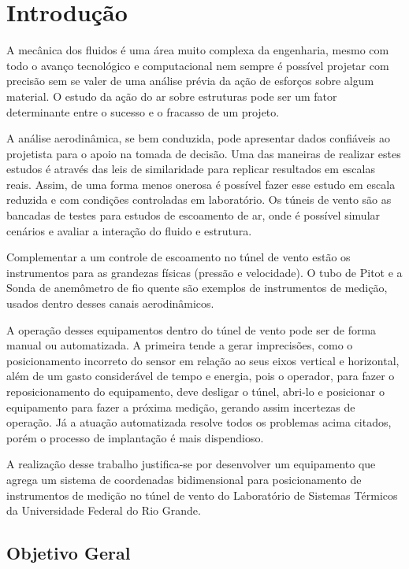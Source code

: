 \chapter{Introdução}\label{ch:introducao}
A mecânica dos fluidos é uma área muito complexa da engenharia, mesmo com todo o avanço tecnológico e computacional 
nem sempre é possível projetar com precisão sem se valer de uma análise prévia da ação de esforços sobre algum material.
O estudo da ação do ar sobre estruturas pode ser um fator determinante entre o sucesso e o fracasso de um projeto.

A análise aerodinâmica, se bem conduzida, pode apresentar dados confiáveis ao projetista para o apoio na tomada 
de decisão. Uma das maneiras de realizar estes estudos é através das leis de similaridade para replicar resultados em escalas reais. 
Assim, de uma forma menos onerosa é possível fazer esse estudo em escala reduzida e com condições controladas 
em laboratório. Os túneis de vento são as bancadas de testes para estudos de escoamento de ar, onde é possível simular cenários e avaliar a interação do fluido e estrutura.

Complementar a um controle de escoamento no túnel de vento estão os instrumentos para as grandezas físicas 
(pressão e velocidade). O tubo de Pitot e a Sonda de anemômetro de fio quente são exemplos de instrumentos 
de medição, usados dentro desses canais aerodinâmicos.

A operação desses equipamentos dentro do túnel de vento pode ser de forma manual ou automatizada. A primeira tende a 
gerar imprecisões, como o posicionamento incorreto do sensor em relação ao seus eixos vertical e horizontal, além de 
um gasto considerável de tempo e energia, pois o operador, para fazer o reposicionamento do equipamento, deve desligar 
o túnel, abri-lo e posicionar o equipamento para fazer a próxima medição, gerando assim incertezas de operação. Já a 
atuação automatizada resolve todos os problemas acima citados, porém o processo de implantação é mais dispendioso. 

A realização desse trabalho justifica-se por desenvolver um equipamento que agrega um sistema de coordenadas 
bidimensional para posicionamento de instrumentos de medição no túnel de vento do Laboratório de Sistemas Térmicos  
da Universidade Federal do Rio Grande.

\section{Objetivo Geral}\label{sec:objetivogeral}

